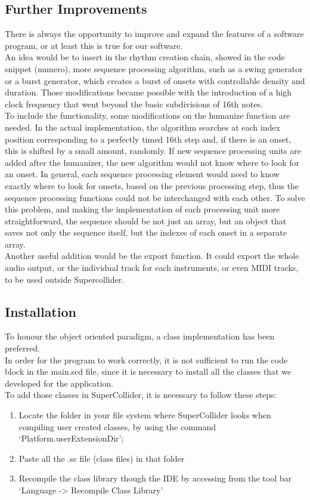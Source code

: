 \documentclass[main.tex]{subfiles}
\begin{document}
\subsection{Further Improvements}

There is always the opportunity to improve and expand the features of a software program, or at least this is true for our software.\\ 
An idea would be to insert in the rhythm creation chain, showed in the code snippet (numero), more sequence processing algorithm, such as a swing generator or a burst generator, which creates a burst of onsets with controllable density and duration. Those modifications became possible with the introduction of a high clock frequency that went beyond the basic subdivisions of 16th notes.\\ 
To include the functionality, some modifications on the humanize function are needed. In the actual implementation, the algorithm searches at each index position corresponding to a perfectly timed 16th step and, if there is an onset, this is shifted by a small amount, randomly. If new sequence processing units are added after the humanizer, the new algorithm would not know where to look for an onset. In general, each sequence processing element would need to know exactly where to look for onsets, based on the previous processing step, thus the sequence processing functions could not be interchanged with each other. To solve this problem, and making the implementation of each processing unit more straightforward, the sequence should be not just an array, but an object that saves not only the sequence itself, but the indexes of each onset in a separate array.\\
Another useful addition would be the export function. It could export the whole audio output, or the individual track for each instruments, or even MIDI tracks, to be used outside Supercollider.

\subsection{Installation}

To honour the object oriented paradigm, a class implementation has been preferred.\\ 
In order for the program to work correctly, it is not sufficient to run the code block in the main.scd file, since it is necessary to install all the classes that we developed for the application.\\
To add those classes in SuperCollider, it is necessary to follow these steps:
\begin{enumerate}
\item Locate the folder in your file system where SuperCollider looks when compiling user created classes, by using the command ‘Platform.userExtensionDir';
\item Paste all the .sc file (class files) in that folder
\item Recompile the class library though the IDE by accessing from the tool bar ‘Language -> Recompile Class Library’
\end{enumerate}
\end{document}
